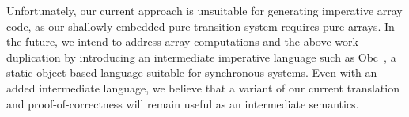 Unfortunately, our current approach is unsuitable for generating imperative array code, as our shallowly-embedded pure transition system requires pure arrays.
In the future, we intend to address array computations and the above work duplication by introducing an intermediate imperative language such as Obc~\cite{biernacki2008clock}, a static object-based language suitable for synchronous systems.
Even with an added intermediate language, we believe that a variant of our current translation and proof-of-correctness will remain useful as an intermediate semantics.
